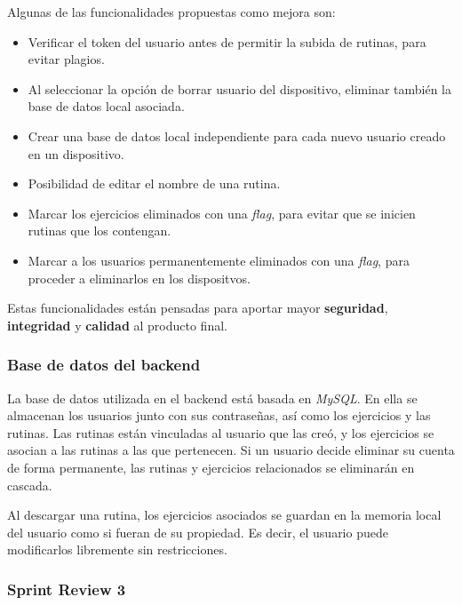 Algunas de las funcionalidades propuestas como mejora son:

\begin{itemize}
  \item Verificar el token del usuario antes de permitir la subida de rutinas, para evitar plagios.
  \item Al seleccionar la opci\'on de borrar usuario del dispositivo, eliminar tambi\'en la base de datos local asociada.
  \item Crear una base de datos local independiente para cada nuevo usuario creado en un dispositivo.
  \item Posibilidad de editar el nombre de una rutina.
  \item Marcar los ejercicios eliminados con una \textit{flag}, para evitar que se inicien rutinas que los contengan.
  \item Marcar a los usuarios permanentemente eliminados con una \textit{flag}, para proceder a eliminarlos en los dispositvos.
\end{itemize}

Estas funcionalidades est\'an pensadas para aportar mayor \textbf{seguridad}, \textbf{integridad} y \textbf{calidad} al producto final.

\subsubsection{Base de datos del backend}
La base de datos utilizada en el backend está basada en \textit{MySQL}. En ella se almacenan los usuarios junto con sus contraseñas, así como los ejercicios y las rutinas. Las rutinas están vinculadas al usuario que las creó, y los ejercicios se asocian a las rutinas a las que pertenecen. Si un usuario decide eliminar su cuenta de forma permanente, las rutinas y ejercicios relacionados se eliminarán en cascada.

Al descargar una rutina, los ejercicios asociados se guardan en la memoria local del usuario como si fueran de su propiedad. Es decir, el usuario puede modificarlos libremente sin restricciones.

\subsubsection{Sprint Review 3}
